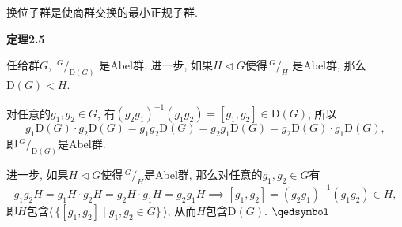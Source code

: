 \documentclass[UTF8]{ctexart}
\begin{document}
\vspace{10pt}

换位子群是使商群交换的最小正规子群.

\vspace{10pt}

\hypertarget{sec:定理2.5}{}
\noindent\textbf{定理2.5}

任给群$G$, $\,\!^{\displaystyle G}\!/_{\displaystyle\mathrm{D}(G)}$
是Abel群. 进一步, 如果$H\lhd G$使得$\,\!^{\displaystyle G}\!/_{\displaystyle H}$
是Abel群, 那么$\mathrm{D}(G)<H$.


对任意的$g_1,g_2\in G$, 有$(g_2g_1)^{-1}(g_1g_2)=[g_1,g_2]\in\mathrm{D}(G)$, 所以
\[
    g_1\mathrm{D}(G)\cdot g_2\mathrm{D}(G)=g_1g_2\mathrm{D}(G)=
    g_2g_1\mathrm{D}(G)=g_2\mathrm{D}(G)\cdot g_1\mathrm{D}(G),
\]
即$\,\!^{\displaystyle G}\!/_{\displaystyle\mathrm{D}(G)}$是Abel群.

\vspace{6pt}
进一步, 如果$H\lhd G$使得$\,\!^{\displaystyle G}\!/_{\displaystyle H}$是Abel群,
那么对任意的$g_1,g_2\in G$有
\[
    g_1g_2H=g_1H\cdot g_2H=g_2H\cdot g_1H=g_2g_1H\implies
    [g_1,g_2]=(g_2g_1)^{-1}(g_1g_2)\in H,
\]
即$H$包含$\langle\,\{[g_1,g_2]\mid g_1,g_2\in G\}\,\rangle$,
从而$H$包含$\mathrm{D}(G)$. \hfill $\qedsymbol$
\end{document}
